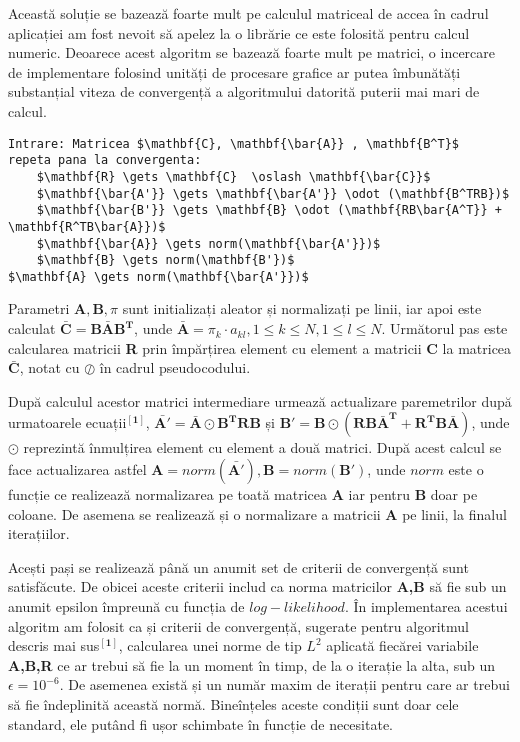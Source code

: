 Această soluție se bazează foarte mult pe calculul matriceal de accea în cadrul aplicației am fost nevoit să apelez la o librărie ce este folosită pentru calcul numeric. Deoarece acest algoritm se bazează foarte mult pe matrici, o incercare de implementare folosind unități de procesare grafice ar putea îmbunătăți substanțial viteza de convergență a algoritmului datorită puterii mai mari de calcul.\par

\begin{lstlisting}[mathescape=true, caption=Pseudocod ce descrie algoritmul de inferență]
Intrare: Matricea $\mathbf{C}, \mathbf{\bar{A}} , \mathbf{B^T}$
repeta pana la convergenta:
	$\mathbf{R} \gets \mathbf{C}  \oslash \mathbf{\bar{C}}$
	$\mathbf{\bar{A'}} \gets \mathbf{\bar{A'}} \odot (\mathbf{B^TRB})$
	$\mathbf{\bar{B'}} \gets \mathbf{B} \odot (\mathbf{RB\bar{A^T}} + \mathbf{R^TB\bar{A}})$
	$\mathbf{\bar{A}} \gets norm(\mathbf{\bar{A'}})$
	$\mathbf{B} \gets norm(\mathbf{B'})$
$\mathbf{A} \gets norm(\mathbf{\bar{A'}})$
\end{lstlisting}

Parametri $\textbf{A},\textbf{B},\pi$ sunt initializați aleator și normalizați pe linii, iar apoi este calculat $\mathbf{\bar{C} = B\bar{A}B^{T}}$, unde $\mathbf{\bar{A}} = {\pi_{k}\cdot a_{kl}}, 1 \leq k \leq N, 1\leq l \leq N$. Următorul pas este calcularea matricii \textbf{R} prin împărțirea element cu element a matricii \textbf{C} la matricea $\mathbf{\bar{C}}$, notat cu $\oslash$ în cadrul pseudocodului.\par

După calculul acestor matrici intermediare urmează actualizare paremetrilor după urmatoarele ecuații$^{\mathbf{[1]}}$, $\mathbf{\bar{A'} = \bar{A} \odot B^{T}RB}$ și $\mathbf{B'} = \mathbf{B} \odot \mathbf{(RB\bar{A}^{T} + R^{T}B\bar{A})}$, unde $\odot$ reprezintă înmulțirea element cu element a două matrici. După acest calcul se face actualizarea astfel $\mathbf{A} = norm(\mathbf{\bar{A'}}),\mathbf{B} = norm(\mathbf{B'})$, unde $norm$ este o funcție ce realizează normalizarea pe toată matricea \textbf{A} iar pentru \textbf{B} doar pe coloane. De asemena se realizează și o normalizare a matricii \textbf{A} pe linii, la finalul iterațiilor.\par

Acești pași se realizează până un anumit set de criterii de convergență sunt satisfăcute. De obicei aceste criterii includ ca norma matricilor \textbf{A,B} să fie sub un anumit epsilon împreună cu funcția de $log-likelihood$. În implementarea acestui algoritm am folosit ca și criterii de convergență, sugerate pentru algoritmul descris mai sus$^{\mathbf{[1]}}$, calcularea unei norme de tip $L^{2}$ aplicată fiecărei variabile \textbf{A,B,R} ce ar trebui să fie la un moment în timp, de la o iterație la alta, sub un $\epsilon = 10^{-6}$. De asemenea există și un număr maxim de iterații pentru care ar trebui să fie îndeplinită această normă. Bineînțeles aceste condiții sunt doar cele standard, ele putând fi ușor schimbate în funcție de necesitate.\par

